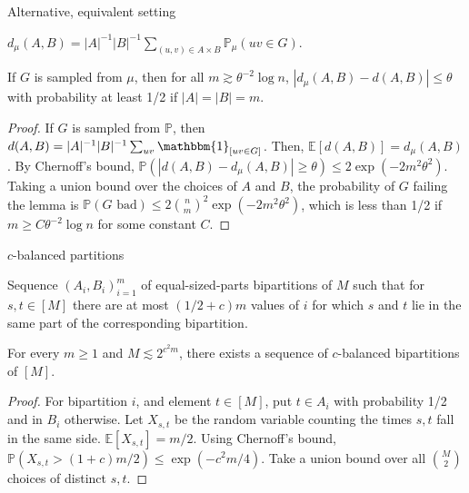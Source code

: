 \documentclass{beamer}
\newcommand{\1}{\mathbbm{1}}
\newcommand{\indicator}[1]{\1_{[#1]}}
\newcommand{\Exp}[1]{\mathbb{E}\left [#1 \right ]}
\newcommand{\Prob}{\mathbb{P}}
\begin{document}
\begin{frame}{Alternative, equivalent setting}
  \begin{definition}
    $d_\mu(A, B) = |A|^{-1} |B|^{-1} \sum_{(u, v) \in A \times B} \Prob_\mu(uv \in G)$.
  \end{definition}

  \pause

  \begin{lemma}
    If $G$ is sampled from $\mu$, then for all $m \gtrsim \theta^{-2} \log n$, $|d_\mu(A,
      B) - d(A, B)| \le \theta$ with probability at least 1/2 if $|A| = |B| = m$.
  \end{lemma}

  \pause

  \begin{proof}
    \pause
    If $G$ is sampled from $\Prob$, then $d(A, B) = |A|^{-1} |B|^{-1} \sum_{uv}
      \indicator{uv \in G}$.
    \pause
    Then, $\Exp{d(A, B)} = d_\mu(A, B)$.
    \pause
    By Chernoff's bound, $\Prob(|d(A, B) - d_\mu(A, B)| \ge \theta) \le 2\exp(-2
      m^2 \theta^2)$.
    \pause
    Taking a union bound over the choices of $A$ and $B$, the probability of $G$
    failing the lemma is $\Prob(G \text{ bad}) \le 2 {n \choose m}^2 \exp(-2 m^2
      \theta^2)$,
    \pause
    which is less than 1/2 if $m \ge C \theta^{-2} \log n$ for some constant $C$.
  \end{proof}
\end{frame}

\begin{frame}{$c$-balanced partitions}
  \begin{definition}
    Sequence $(A_i, B_i)_{i = 1}^m$ of equal-sized-parts bipartitions of $M$ such that
    for $s, t \in [M]$ there are at most $(1/2 + c)m$ values of $i$ for which $s$ and
    $t$ lie in the same part of the corresponding bipartition.
  \end{definition}

  \pause

  \begin{lemma}
    For every $m \ge 1$ and $M \lesssim 2^{c^2 m}$, there exists a sequence of
    $c$-balanced bipartitions of $[M]$.
  \end{lemma}

  \pause

  \begin{proof}
    \pause
    For bipartition $i$, and element $t \in [M]$, put $t \in A_i$ with probability 1/2
    and in $B_i$ otherwise.
    \pause
    Let $X_{s, t}$ be the random variable counting the times $s, t$ fall in the same
    side.
    \pause
    $\Exp{X_{s, t}} = m/2$. Using Chernoff's bound, $\Prob(X_{s, t} > (1 + c)m/2) \le
      \exp(-c^2 m/4)$.
    \pause
    Take a union bound over all ${M \choose 2}$ choices of distinct $s, t$.
  \end{proof}
\end{frame}
\end{document}
